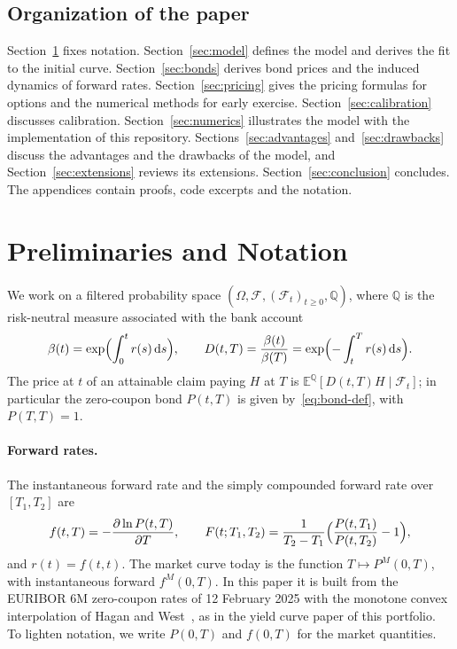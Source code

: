 \documentclass[11pt,a4paper]{article}
\theoremstyle{plain}
\theoremstyle{definition}
\newcommand{\dd}{\mathrm{d}}
\newcommand{\E}{\mathbb{E}}
\newcommand{\Q}{\mathbb{Q}}
\newcommand{\F}{\mathcal{F}}
\begin{document}
\subsection{Organization of the paper}
Section~\ref{sec:prelim} fixes notation. Section~\ref{sec:model} defines the model and derives the fit to the initial curve. Section~\ref{sec:bonds} derives bond prices and the induced dynamics of forward rates. Section~\ref{sec:pricing} gives the pricing formulas for options and the numerical methods for early exercise. Section~\ref{sec:calibration} discusses calibration. Section~\ref{sec:numerics} illustrates the model with the implementation of this repository. Sections~\ref{sec:advantages} and~\ref{sec:drawbacks} discuss the advantages and the drawbacks of the model, and Section~\ref{sec:extensions} reviews its extensions. Section~\ref{sec:conclusion} concludes. The appendices contain proofs, code excerpts and the notation.

\clearpage
\section{Preliminaries and Notation}
\label{sec:prelim}

We work on a filtered probability space $(\Omega,\F,(\F_t)_{t\geq0},\Q)$, where $\Q$ is the risk-neutral measure associated with the bank account
\begin{equation}
    \beta(t)=\exp\Bigl(\int_0^t r(s)\,\dd s\Bigr),
    \qquad
    D(t,T)=\frac{\beta(t)}{\beta(T)}=\exp\Bigl(-\int_t^T r(s)\,\dd s\Bigr).
\end{equation}
The price at $t$ of an attainable claim paying $H$ at $T$ is $\E^\Q[D(t,T)H\mid\F_t]$; in particular the zero-coupon bond $P(t,T)$ is given by~\eqref{eq:bond-def}, with $P(T,T)=1$.

\paragraph{Forward rates.} The instantaneous forward rate and the simply compounded forward rate over $[T_1,T_2]$ are
\begin{equation}
    f(t,T)=-\frac{\partial\ln P(t,T)}{\partial T},
    \qquad
    F(t;T_1,T_2)=\frac{1}{T_2-T_1}\Bigl(\frac{P(t,T_1)}{P(t,T_2)}-1\Bigr),
    \label{eq:forwards}
\end{equation}
and $r(t)=f(t,t)$. The market curve today is the function $T\mapsto P^M(0,T)$, with instantaneous forward $f^M(0,T)$. In this paper it is built from the EURIBOR 6M zero-coupon rates of 12 February 2025 with the monotone convex interpolation of Hagan and West~\cite{haganwest2006}, as in the yield curve paper of this portfolio. To lighten notation, we write $P(0,T)$ and $f(0,T)$ for the market quantities.
\end{document}
